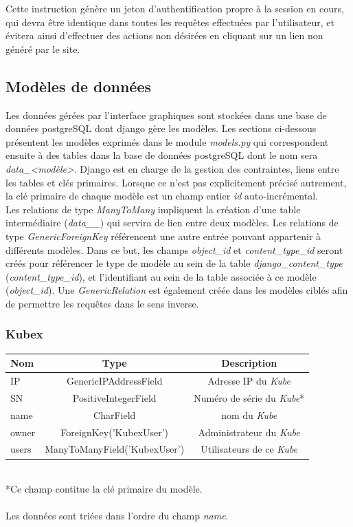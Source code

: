 \documentclass[a4paper]{report}
\begin{document}
Cette instruction génère un jeton d'authentification propre à la session en cours, qui devra être identique dans toutes les requêtes effectuées par l'utilisateur, et évitera ainsi d'effectuer des actions non désirées en cliquant sur un lien non généré par le site.

\subsection{Modèles de données}
\label{subsec:model}
Les données gérées par l'interface graphiques sont stockées dans une base de données postgreSQL dont django gère les modèles. Les sections ci-dessous présentent les modèles exprimés dans le module \emph{models.py} qui correspondent ensuite à des tables dans la base de données postgreSQL dont le nom sera \emph{data\_<modèle>}. Django est en charge de la gestion des contraintes, liens entre les tables et clés primaires. Lorsque ce n'est pas explicitement précisé autrement, la clé primaire de chaque modèle est un champ entier \emph{id} auto-incrémental.\\

Les relations de type \emph{ManyToMany} impliquent la création d'une table intermédiaire (\emph{data\_<modèle1>\_<modèle2>}) qui servira de lien entre deux modèles.
Les relations de type \emph{GenericForeignKey} référencent une autre entrée pouvant appartenir à différents modèles. Dans ce but, les champs \emph{object\_id} et \emph{content\_type\_id} seront créés pour référencer le type de modèle au sein de la table \emph{django\_content\_type} (\emph{content\_type\_id}), et l'identifiant au sein de la table associée à ce modèle (\emph{object\_id}). Une \emph{GenericRelation} est également créée dans les modèles ciblés afin de permettre les requêtes dans le sens inverse.

\subsubsection{Kubex}
\begin{tabular}{|l|c|c|}
	\hline
	\textbf{Nom} & \textbf{Type} & \textbf{Description} \\
	\hline
	IP & GenericIPAddressField & Adresse IP du \emph{Kube} \\
	SN & PositiveIntegerField & Numéro de série du \emph{Kube}* \\
	name & CharField & nom du \emph{Kube} \\
	owner & ForeignKey('KubexUser') & Administrateur du \emph{Kube} \\
	users & ManyToManyField('KubexUser') & Utilisateurs de ce \emph{Kube} \\
	\hline
\end{tabular}
~\\
*Ce champ contitue la clé primaire du modèle.\\\\
Les données sont triées dans l'ordre du champ \emph{name}.
\end{document}
